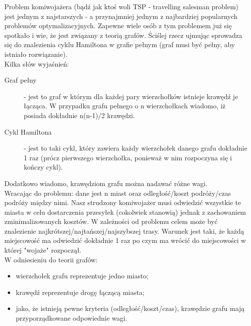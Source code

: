 Problem komiwojażera (bądź jak ktoś woli TSP - travelling salesman problem) jest jednym z najstarszych - a przynajmniej
jednym z najbardziej popularnych problemów optymalizacyjnych. Zapewne wiele osób z tym problemem już się spotkało i wie,
że jest związany z teorią grafów. Ściślej rzecz ujmując sprowadza się do znalezienia cyklu Hamiltona w grafie pełnym
(graf musi być pełny, aby istniało rozwiązanie).\\

\noindent Kilka słów wyjaśnień:

\begin{description}
\item [Graf pełny] - jest to graf w którym dla każdej pary wierzchołków istnieje krawędź je łącząca.
             W przypadku grafu pełnego o n wierzchołkach wiadomo, iż posiada dokładnie n(n-1)/2 krawędzi.
\item [Cykl Hamiltona] - jest to taki cykl, który zawiera każdy wierzchołek danego grafu dokładnie 1 raz (prócz pierwszego
                 wierzchołka, ponieważ w nim rozpoczyna się i kończy cykl).
\end{description}
Dodatkowo wiadomo, krawędziom grafu można nadawać różne wagi.\\

Wracając do problemu: dane jest n miast oraz odległość/koszt podróży/czas podróży między nimi. Nasz strudzony
komiwojażer musi odwiedzić wszystkie te miasta w celu dostarczenia przesyłek (cokolwiek stanowią) jednak z zachowaniem
zminimalizowanych kosztów. W zależności od problemu celem może być znalezienie najkrótszej/najtańszej/najszybszej trasy.
Warunek jest taki, że każdą miejscowość ma odwiedzić dokładnie 1 raz po czym ma wrócić do miejscowości w której "wojaże"
rozpoczął.\\

\noindent W odniesieniu do teorii grafów:
\begin{itemize}
\item wierzchołek grafu reprezentuje jedno miasto;
\item  krawędź reprezentuje drogę łączącą miasta;
\item  jako, że istnieją pewne kryteria (odległość/koszt/czas), krawędzie grafu mają przyporządkowane odpowiednie wagi.
\end{itemize}